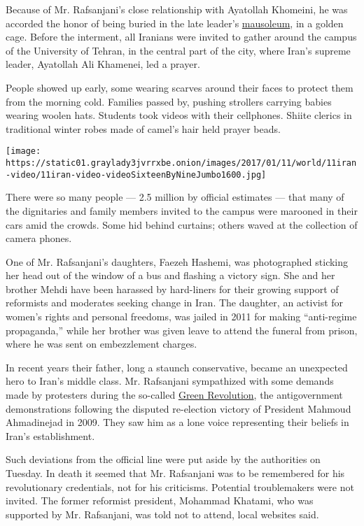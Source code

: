 Because of Mr. Rafsanjani's close relationship with Ayatollah Khomeini,
he was accorded the honor of being buried in the late leader's
\href{https://www.google.co.uk/search?q=khomeini+mausoleum+sciolino\&biw=1718\&bih=912\&tbm=isch\&tbo=u\&source=univ\&sa=X\&ved=0ahUKEwiMqsuqw7fRAhWrLMAKHfWlBHgQsAQIGQ}{mausoleum},
in a golden cage. Before the interment, all Iranians were invited to
gather around the campus of the University of Tehran, in the central
part of the city, where Iran's supreme leader, Ayatollah Ali Khamenei,
led a prayer.

People showed up early, some wearing scarves around their faces to
protect them from the morning cold. Families passed by, pushing
strollers carrying babies wearing woolen hats. Students took videos with
their cellphones. Shiite clerics in traditional winter robes made of
camel's hair held prayer beads.

\texttt{[image: https://static01.graylady3jvrrxbe.onion/images/2017/01/11/world/11iran-video/11iran-video-videoSixteenByNineJumbo1600.jpg]}

There were so many people --- 2.5 million by official estimates --- that
many of the dignitaries and family members invited to the campus were
marooned in their cars amid the crowds. Some hid behind curtains; others
waved at the collection of camera phones.

One of Mr. Rafsanjani's daughters, Faezeh Hashemi, was photographed
sticking her head out of the window of a bus and flashing a victory
sign. She and her brother Mehdi have been harassed by hard-liners for
their growing support of reformists and moderates seeking change in
Iran. The daughter, an activist for women's rights and personal
freedoms, was jailed in 2011 for making ``anti-regime propaganda,''
while her brother was given leave to attend the funeral from prison,
where he was sent on embezzlement charges.

In recent years their father, long a staunch conservative, became an
unexpected hero to Iran's middle class. Mr. Rafsanjani sympathized with
some demands made by protesters during the so-called
\href{http://www.nytimes3xbfgragh.onion/2009/06/14/world/middleeast/14iran.html}{Green
Revolution}, the antigovernment demonstrations following the disputed
re-election victory of President Mahmoud Ahmadinejad in 2009. They saw
him as a lone voice representing their beliefs in Iran's establishment.

Such deviations from the official line were put aside by the authorities
on Tuesday. In death it seemed that Mr. Rafsanjani was to be remembered
for his revolutionary credentials, not for his criticisms. Potential
troublemakers were not invited. The former reformist president, Mohammad
Khatami, who was supported by Mr. Rafsanjani, was told not to attend,
local websites said.

